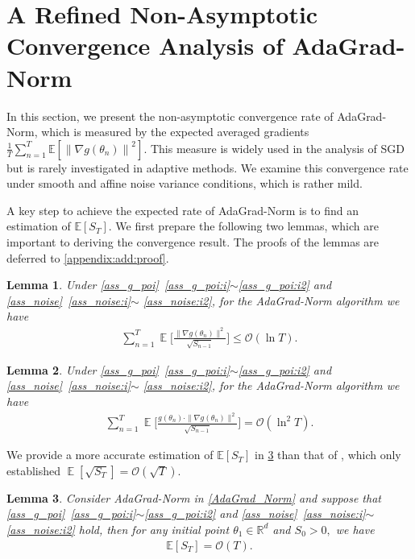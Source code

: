 \documentclass[standalone]{article}
\newcommand{\E}{\mathbb{E}}
\newtheorem{lem}{Lemma}[section]
\DeclareMathOperator{\Expect}{\mathbb{E}}
\begin{document}
\section{A Refined Non-Asymptotic Convergence Analysis of AdaGrad-Norm}\label{sec:nonasympt}
In this section, we present the non-asymptotic convergence rate of AdaGrad-Norm, which is measured by the expected averaged gradients $\frac{1}{T} \sum_{n=1}^{T} \E[\left\|\nabla g(\theta_n) \right\|^2]$. This measure is widely used in the analysis of SGD but is rarely investigated in adaptive methods. We examine this convergence rate under smooth and affine noise variance conditions, which is rather mild. %


A key step to achieve the expected rate of AdaGrad-Norm is to find an estimation of $\E[S_T]$. We first prepare the following two lemmas, which are important to deriving the convergence result. The proofs of the lemmas are deferred to \cref{appendix:add:proof}.
\begin{lem}\label{lem8}
Under \cref{ass_g_poi}~\ref{ass_g_poi:i}$\sim$\ref{ass_g_poi:i2} and  \cref{ass_noise}~\ref{ass_noise:i}$\sim$ \ref{ass_noise:i2}, for the AdaGrad-Norm algorithm we have
\begin{equation}\nonumber\begin{aligned}
\sum_{n=1}^{T}\Expect\bigg[\frac{\big\|\nabla g(\theta_{n})\big\|^{2}}{\sqrt{S_{n-1}}}\bigg] \leq \mathcal{O}(\ln T).
\end{aligned}\end{equation} 
\end{lem}
\begin{lem}\label{lem23} 
Under \cref{ass_g_poi}~\ref{ass_g_poi:i}$\sim$\ref{ass_g_poi:i2} and  \cref{ass_noise}~\ref{ass_noise:i}$\sim$ \ref{ass_noise:i2}, for the AdaGrad-Norm algorithm we have
\begin{equation}\label{adagrad:123321}\begin{aligned}
\sum_{n=1}^{T}\Expect\Bigg[\frac{g(\theta_{n})\cdot\|\nabla g(\theta_{n})\|^{2}}{\sqrt{S_{n-1}}}\Bigg]=\mathcal{O}(\ln^{2} T).
\end{aligned}\end{equation} 
\end{lem} 
We provide a more accurate estimation of $\E[S_T]$ in \cref{lem:st} than  that of \cite{wang2023convergence}, which only established $\Expect[\sqrt{S_{T}}] = \mathcal{O}(\sqrt{T})$. 
\begin{lem}\label{lem:st}
Consider AdaGrad-Norm in \cref{AdaGrad_Norm} and suppose that   \cref{ass_g_poi}~\ref{ass_g_poi:i}$\sim$\ref{ass_g_poi:i2} and  \cref{ass_noise}~\ref{ass_noise:i}$\sim$ \ref{ass_noise:i2} hold, then for any initial point $\theta_{1}\in \mathbb{R}^{d}$ and $S_{0}>0,$  we have
\begin{align}
\E[S_T] = \mathcal{O}\left(T\right).
\end{align}
\end{lem}
\end{document}
